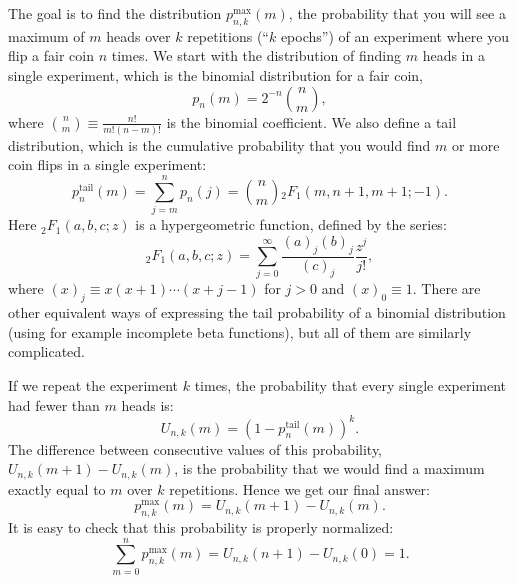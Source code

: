 \documentclass[11pt]{article}
\begin{document}
The goal is to find the distribution $p^{\text{max}}_{n,k}(m)$, the probability that you will see a maximum of $m$ heads over $k$ repetitions (``$k$ epochs'') of an experiment where you flip a fair coin $n$ times. We start with the distribution of finding $m$ heads in a single experiment, which is the binomial distribution for a fair coin,
\begin{equation}
    p_n(m) = 2^{-n} \binom{n}{m},
\end{equation}
where $\binom{n}{m} \equiv \frac{n!}{m!(n-m)!}$ is the binomial coefficient. We also define a tail distribution, which is the cumulative probability that you would find $m$ or more coin flips in a single experiment:
\begin{equation}
    p^{\text{tail}}_n(m) = \sum_{j=m}^{n} p_n(j) = \binom{n}{m} {}_{2}F_1(m,n+1,m+1; -1).
\end{equation}
Here ${}_2 F_1(a,b,c;z)$ is a hypergeometric function, defined by the series:
\begin{equation}
{}_2 F_1(a,b,c;z) = \sum_{j=0}^\infty\frac{ (a)_j (b)_j}{ (c)_j}\frac{z^j}{j!},
\end{equation}
where $(x)_j \equiv x (x+1) \cdots (x+j-1)$ for $j>0$ and $(x)_0 \equiv 1$.  There are other equivalent ways of expressing the tail probability of a binomial distribution (using for example incomplete beta functions), but all of them are similarly complicated.

If we repeat the experiment $k$ times, the probability that every single experiment had fewer than $m$ heads is:
\begin{equation}
    U_{n,k}(m) = (1- p^{\text{tail}}_n(m))^k.
\end{equation}
The difference between consecutive values of this probability, $U_{n,k}(m+1) - U_{n,k}(m)$, is the probability that we would find a maximum exactly equal to $m$ over $k$ repetitions.  Hence we get our final answer:
\begin{equation}
    p^{\text{max}}_{n,k}(m) = U_{n,k}(m+1) - U_{n,k}(m).
\end{equation}
It is easy to check that this probability is properly normalized:
\begin{equation}
    \sum_{m=0}^n p^{\text{max}}_{n,k}(m) = U_{n,k}(n+1) - U_{n,k}(0) = 1.
\end{equation}
\end{document}
